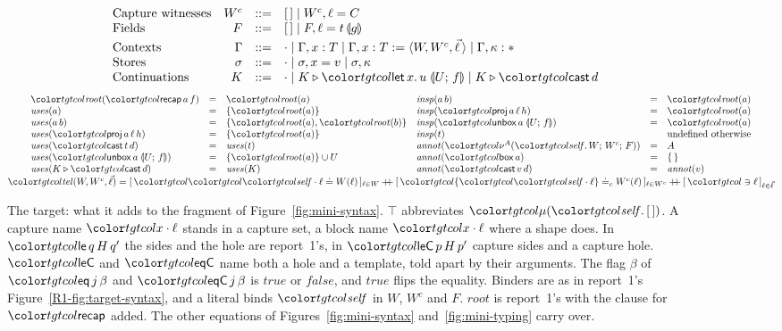\begin{figure}[t]
\[\begin{array}{@{}lrcl@{}}
\text{Capture witnesses} & W^{c} & ::= & \tnil \mid W^{c}, \ell = C \\
\text{Fields} & F & ::= & \tnil \mid F, \ell = t\,\ann{g} \\[2pt]
\text{Contexts} & \Gamma & ::= & \cdot \mid \Gamma, x : T \mid \Gamma, x : T \mathrel{:=} \langle W, W^{c}, \vec{\ell}\,\rangle \mid \Gamma, \kappa : \cstar \\
\text{Stores} & \sigma & ::= & \cdot \mid \sigma, x = v \mid \sigma, \kappa \\
\text{Continuations} & K & ::= & \cdot \mid K \triangleright \frlet{x}{u}{U}{f} \mid K \triangleright \ev{cast}\,d
\end{array}
\]
\[
\begin{array}{@{}c@{}}
\begin{array}[t]{@{}lcl@{}}
\rt{\ev{recap}\,a\,f} & = & \rt{a} \\
\uses{a} & = & \cset{\rt{a}} \\
\uses{a\,b} & = & \cset{\rt{a}, \rt{b}} \\
\uses{\ev{proj}\,a\,\ell\,h} & = & \cset{\rt{a}} \\
\uses{\ev{cast}\,t\,d} & = & \uses{t} \\
\uses{\unboxc{a}{U}{f}} & = & \cset{\rt{a}} \cup U \\
\uses{K \triangleright \ev{cast}\,d} & = & \uses{K}
\end{array}
\quad
\begin{array}[t]{@{}lcl@{}}
\insp{a\,b} & = & \rt{a} \\
\insp{\ev{proj}\,a\,\ell\,h} & = & \rt{a} \\
\insp{\unboxc{a}{U}{f}} & = & \rt{a} \\
\insp{t} & & \text{undefined otherwise} \\
\annot{\litc{A}{W}{W^{c}}{F}} & = & A \\
\annot{\ev{box}\,a} & = & \cempty \\
\annot{\ev{cast}\,v\,d} & = & \annot{v}
\end{array} \\[3pt]
\ofLit{W, W^{c}}{\vec{\ell}} = [\,\peq{\sel{\self}{\ell}}{W(\ell)}\,]_{\ell \in W} \mathbin{+\!\!+} [\,\peqc{\cset{\sel{\self}{\ell}}}{W^{c}(\ell)}\,]_{\ell \in W^{c}} \mathbin{+\!\!+} [\,\phas{\ell}\,]_{\ell \in \vec{\ell}}
\end{array}
\]
\color{black}
\caption{The \treeK target: what it adds to the fragment of Figure~\ref{fig:mini-syntax}. $\top$ abbreviates $\obj{\tnil}$. A capture name $\sel{x}{\ell}$ stands in a capture set, a block name $\sel{x}{\ell}$ where a shape does. In $\ev{le}\,q\,H\,q'$ the sides and the hole are report~1's, in $\ev{leC}\,p\,H\,p'$ capture sides and a capture hole. $\ev{leC}$ and $\ev{eqC}$ name both a hole and a template, told apart by their arguments. The flag $\beta$ of $\ev{eq}\,j\,\beta$ and $\ev{eqC}\,j\,\beta$ is $\mathit{true}$ or $\mathit{false}$, and $\mathit{true}$ flips the equality. Binders are as in report~1's Figure~\ref{R1-fig:target-syntax}, and a literal binds $\self$ in $W$, $W^{c}$ and $F$. $\mathit{root}$ is report~1's with the clause for $\ev{recap}$ added. The other equations of Figures~\ref{fig:mini-syntax} and~\ref{fig:mini-typing} carry over.}

\end{figure}
